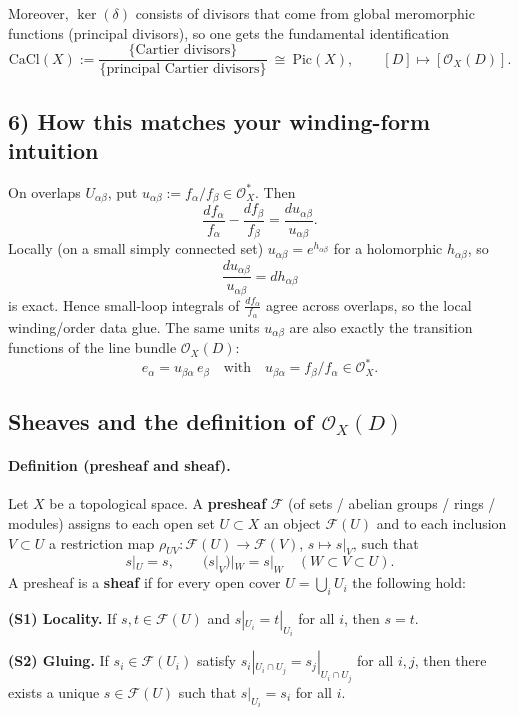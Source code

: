 \documentclass[11pt,openany]{article}
\renewcommand{\emph}[1]{\textbf{#1}}
\begin{document}
Moreover, $\ker(\delta)$ consists of divisors that come from global meromorphic functions (principal divisors),
so one gets the fundamental identification
\[
\mathrm{CaCl}(X):=\frac{\{\text{Cartier divisors}\}}{\{\text{principal Cartier divisors}\}}
\ \cong\ \mathrm{Pic}(X),
\qquad
[D]\longmapsto [\mathcal O_X(D)].
\]

\subsection*{6) How this matches your winding-form intuition}
On overlaps $U_{\alpha\beta}$, put $u_{\alpha\beta}:=f_\alpha/f_\beta\in \mathcal O_X^*$.
Then
\[
\frac{df_\alpha}{f_\alpha}-\frac{df_\beta}{f_\beta}=\frac{du_{\alpha\beta}}{u_{\alpha\beta}}.
\]
Locally (on a small simply connected set) $u_{\alpha\beta}=e^{h_{\alpha\beta}}$ for a holomorphic $h_{\alpha\beta}$, so
\[
\frac{du_{\alpha\beta}}{u_{\alpha\beta}}=dh_{\alpha\beta}
\]
is exact. Hence small-loop integrals of $\frac{df_\alpha}{f_\alpha}$ agree across overlaps,
so the local winding/order data glue. The same units $u_{\alpha\beta}$ are also exactly the
transition functions of the line bundle $\mathcal O_X(D)$:
\[
e_\alpha = u_{\beta\alpha}\, e_\beta
\quad\text{with}\quad u_{\beta\alpha}=f_\beta/f_\alpha\in \mathcal O_X^*.
\]


\newpage
\subsection*{Sheaves and the definition of $\mathcal O_X(D)$}

\paragraph{Definition (presheaf and sheaf).}
Let $X$ be a topological space. A \emph{presheaf} $\mathcal F$ (of sets / abelian groups / rings / modules)
assigns to each open set $U\subset X$ an object $\mathcal F(U)$ and to each inclusion $V\subset U$
a restriction map $\rho_{UV}:\mathcal F(U)\to \mathcal F(V)$, $s\mapsto s|_V$, such that
\[
s|_U=s,\qquad (s|_V)|_W=s|_W\quad (W\subset V\subset U).
\]
A presheaf is a \emph{sheaf} if for every open cover $U=\bigcup_i U_i$ the following hold:

\smallskip
\noindent\textbf{(S1) Locality.}
If $s,t\in \mathcal F(U)$ and $s|_{U_i}=t|_{U_i}$ for all $i$, then $s=t$.

\noindent\textbf{(S2) Gluing.}
If $s_i\in \mathcal F(U_i)$ satisfy $s_i|_{U_i\cap U_j}=s_j|_{U_i\cap U_j}$ for all $i,j$,
then there exists a unique $s\in \mathcal F(U)$ such that $s|_{U_i}=s_i$ for all $i$.
\end{document}
